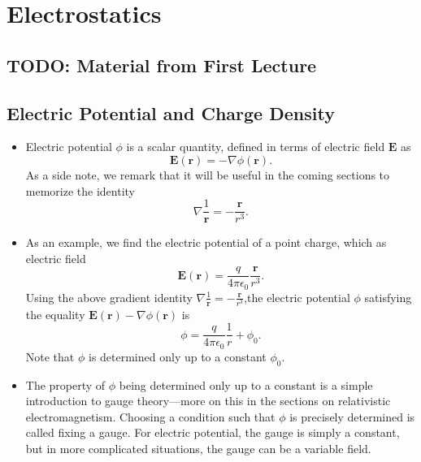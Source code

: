 \documentclass[11pt, a4paper]{article}
\renewcommand{\vec}[1]{\bm{#1}} %
\renewcommand{\r}{\vec{r}}
\newcommand{\E}{\vec{E}} %
\newcommand{\ee}{\epsilon_{0}}  %
\renewcommand{\grad}{\nabla}
\begin{document}
\newpage
\tableofcontents
\newpage



\section{Electrostatics}

\subsection{TODO: Material from First Lecture}


\subsection{Electric Potential and Charge Density}
\begin{itemize}
	\item Electric potential $ \phi $ is a scalar quantity, defined in terms of electric field $ \E $ as
	\begin{equation*}
		\E(\r) = - \grad \phi(\r).
	\end{equation*}
	As a side note, we remark that it will be useful in the coming sections to memorize the identity
	\begin{equation*}
		\grad \frac{1}{\r} = - \frac{\r}{r^{3}}.
	\end{equation*}
	
	\item As an example, we find the electric potential of a point charge, which as electric field
	\begin{equation*}
		\E(\r) = \frac{q}{4\pi \ee} \frac{\r}{r^{3}}.
	\end{equation*}
	Using the above gradient identity $ \grad \frac{1}{\r} = - \frac{\r}{r^{3}} $,the electric potential $ \phi $  satisfying the equality $ \E(\r)  -\grad \phi(\r) $ is
	\begin{equation*}
		\phi = \frac{q}{4\pi \ee}\frac{1}{r} + \phi_{0}.
	\end{equation*}
	Note that $ \phi $ is determined only up to a constant $ \phi_{0} $.
	
	\item The property of $ \phi $ being determined only up to a constant is a simple introduction to gauge theory---more on this in the sections on relativistic electromagnetism. Choosing a condition such that $ \phi $ is precisely determined is called fixing a gauge. For electric potential, the gauge is simply a constant, but in more complicated situations, the gauge can be a variable field.
	
\end{itemize}
\end{document}
